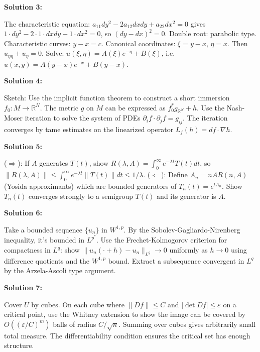 \documentclass[12pt,a4paper]{exam}
\begin{document}
\textbf{Solution 3:}

The characteristic equation: $a_{11} dy^2 - 2a_{12} dx dy + a_{22} dx^2 = 0$ gives $1\cdot dy^2 - 2\cdot1\cdot dx dy + 1\cdot dx^2 = 0$, so $(dy - dx)^2 = 0$. Double root: parabolic type. Characteristic curves: $y - x = c$. Canonical coordinates: $\xi = y - x$, $\eta = x$. Then $u_{\eta\eta} + u_\eta = 0$. Solve: $u(\xi,\eta) = A(\xi) e^{-\eta} + B(\xi)$, i.e. $u(x,y) = A(y-x) e^{-x} + B(y-x)$.

\vspace{0.5cm}

\textbf{Solution 4:}

Sketch: Use the implicit function theorem to construct a short immersion $f_0: M \to \mathbb{R}^N$. The metric $g$ on $M$ can be expressed as $f_0^*g_{\mathbb{R}^N} + h$. Use the Nash-Moser iteration to solve the system of PDEs $\partial_i f \cdot \partial_j f = g_{ij}$. The iteration converges by tame estimates on the linearized operator $L_f(h) = df \cdot \nabla h$.

\vspace{0.5cm}

\textbf{Solution 5:}

($\Rightarrow$): If $A$ generates $T(t)$, show $R(\lambda,A) = \int_0^\infty e^{-\lambda t} T(t) dt$, so $\|R(\lambda,A)\| \leq \int_0^\infty e^{-\lambda t} \|T(t)\| dt \leq 1/\lambda$. ($\Leftarrow$): Define $A_n = nAR(n,A)$ (Yosida approximants) which are bounded generators of $T_n(t) = e^{t A_n}$. Show $T_n(t)$ converges strongly to a semigroup $T(t)$ and its generator is $A$.

\vspace{0.5cm}

\textbf{Solution 6:}

Take a bounded sequence $\{u_n\}$ in $W^{1,p}$. By the Sobolev-Gagliardo-Nirenberg inequality, it's bounded in $L^{p^*}$. Use the Frechet-Kolmogorov criterion for compactness in $L^q$: show $\|u_n(\cdot + h) - u_n\|_{L^q} \to 0$ uniformly as $h \to 0$ using difference quotients and the $W^{1,p}$ bound. Extract a subsequence convergent in $L^q$ by the Arzela-Ascoli type argument.

\vspace{0.5cm}

\textbf{Solution 7:}

Cover $U$ by cubes. On each cube where $\|Df\| \leq C$ and $|\det Df| \leq \varepsilon$ on a critical point, use the Whitney extension to show the image can be covered by $O((\varepsilon/C)^{m})$ balls of radius $C/\sqrt{n}$. Summing over cubes gives arbitrarily small total measure. The differentiability condition ensures the critical set has enough structure.
\end{document}
